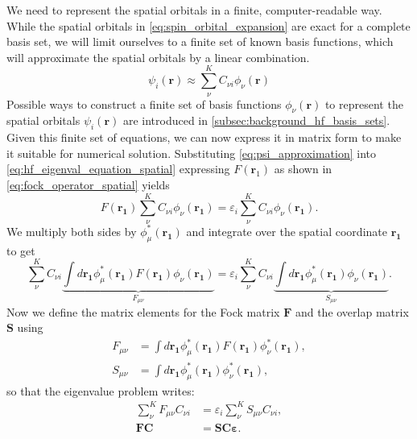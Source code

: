 We need to represent the spatial orbitals in a finite, computer-readable way. While the spatial orbitals in \autoref{eq:spin_orbital_expansion} are exact for a complete basis set, we will limit ourselves to a finite set of known basis functions, which will approximate the spatial orbitals by a linear combination.
\begin{equation}
    \label{eq:psi_approximation}
    \psi_i(\mathbf{r}) \approx \sum_{\nu}^{K} C_{\nu i} \phi_\nu(\mathbf{r})
\end{equation}
Possible ways to construct a finite set of basis functions $\phi_\nu(\mathbf{r})$ to represent the spatial orbitals $\psi_i(\mathbf{r})$ are introduced in \autoref{subsec:background_hf_basis_sets}. \\
Given this finite set of equations, we can now express it in matrix form to make it suitable for numerical solution.
Substituting \autoref{eq:psi_approximation} into \autoref{eq:hf_eigenval_equation_spatial} expressing $F(\mathbf{r}_1)$ as shown in \autoref{eq:fock_operator_spatial} yields
\begin{equation}
    \label{eq:roothhaan_intermediate_1}
    F(\mathbf{r_1}) \sum_{\nu}^{K} C_{\nu i} \phi_\nu(\mathbf{r_1}) = \varepsilon_i \sum_{\nu}^{K} C_{\nu i} \phi_\nu(\mathbf{r_1}).
\end{equation}
We multiply both sides by $\phi_\mu^*(\mathbf{r_1})$ and integrate over the spatial coordinate $\mathbf{r_1}$ to get
\begin{equation}
    \label{eq:roothaan_equations}
        \sum_{\nu}^{K} C_{\nu i} \underbrace{\int d\mathbf{r_1} \phi_\mu^*(\mathbf{r_1}) F(\mathbf{r_1}) \phi_\nu(\mathbf{r_1})}_{F_{\mu\nu}} = \varepsilon_i \sum_{\nu}^{K} C_{\nu i} \underbrace{\int d\mathbf{r_1} \phi_\mu^*(\mathbf{r_1})\phi_\nu(\mathbf{r_1})}_{S_{\mu\nu}}.
\end{equation}
Now we define the matrix elements for the Fock matrix $\mathbf{F}$ and the overlap matrix $\mathbf{S}$ using
\begin{subequations}
    \label{eq:roothaan_matrices}
    \begin{align}
        F_{\mu \nu} &= \int d\mathbf{r_1} \phi_\mu^*(\mathbf{r_1}) F(\mathbf{r_1}) \phi_\nu^*(\mathbf{r_1}), \label{eq:roothaan_mat_F}\\
        S_{\mu \nu} &= \int d\mathbf{r_1} \phi_\mu^*(\mathbf{r_1}) \phi_\nu^*(\mathbf{r_1}),
    \end{align}
\end{subequations}
so that the eigenvalue problem writes:
\begin{subequations}
    \begin{align}
        \sum_{\nu}^{K} F_{\mu\nu} C_{\nu i}  &= \varepsilon_i \sum_{\nu}^{K} S_{\mu\nu} C_{\nu i},\\
        \mathbf{FC} &= \mathbf{SC} \boldsymbol{\varepsilon}.    \label{eq:roothaan_equations_matrix}
    \end{align}
\end{subequations} 
